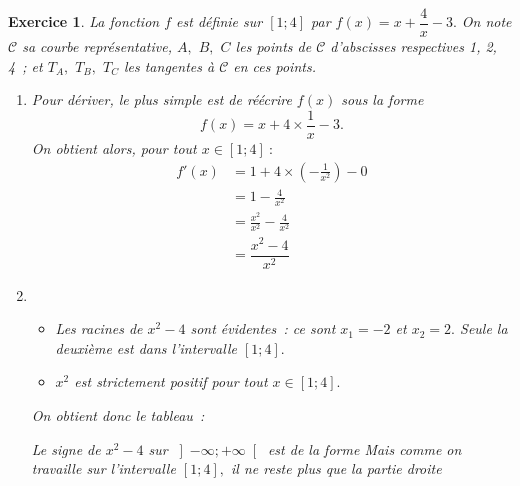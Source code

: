 \documentclass[10pt]{article}
\newtheorem{exo}{Exercice}
\begin{document}
\begin{exo}

La fonction $f$ est définie sur $\left[1;4\right]$ par $f(x)=x+\dfrac{4}{x}-3.$ On note $\mathcal{C}$ sa courbe représentative, $A,$ $B,$ $C$ les points de $\mathcal{C}$ d'abscisses respectives 1, 2, 4~; et $T_A,$ $T_B,$ $T_C$ les tangentes à $\mathcal{C}$ en ces points.
 
\begin{enumerate}
\item Pour dériver, le plus simple est de réécrire $f(x)$ sous la forme \[f(x)=x+4\times\dfrac{1}{x}-3.\] On obtient alors, pour tout $x\in \left[1;4\right]~:$
\begin{align*}
f'(x)&=1+4\times\left(-\frac{1}{x^2}\right)-0\\
&=1-\frac{4}{x^2}\\
&=\frac{x^2}{x^2}-\frac{4}{x^2}\\
&=\dfrac{x^2-4}{x^2}
\end{align*} 
\item \begin{itemize}
\item[\textbullet] Les racines de $x^2-4$ sont évidentes~: ce sont $x_1=-2$ et $x_2=2.$ Seule la deuxième est dans l'intervalle $\left[1;4\right].$
\item[\textbullet] $x^2$ est strictement positif pour tout $x\in \left[1;4\right].$
\end{itemize}

On obtient donc le tableau~:

\medskip

\setlength{\columnseprule}{1pt}

\begin{multicols}{2}
\begin{center}
\end{center}

\columnbreak

Le signe de $x^2-4$ sur $\left]-\infty;+\infty\right[$ est de la forme \fbox{$+~\upphi~-~\upphi~+$} Mais comme on travaille sur l'intervalle $\left[1;4\right],$ il ne reste plus que la partie droite \fbox{$-~\upphi~+$}

\medskip


\end{multicols}
\end{enumerate}
\end{exo}
\end{document}
